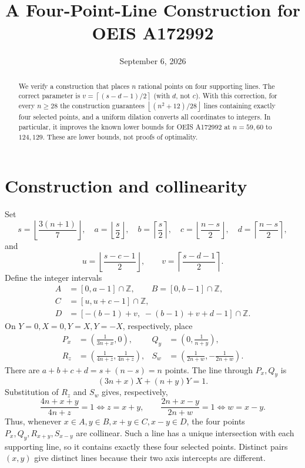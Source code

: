 \documentclass[11pt,a4paper]{article}
\title{A Four-Point-Line Construction for OEIS A172992}
\author{}
\date{September 6, 2026}
\newcommand{\floor}[1]{\left\lfloor #1\right\rfloor}
\newcommand{\ceil}[1]{\left\lceil #1\right\rceil}
\newcommand{\Z}{\mathbb Z}
\begin{document}
\maketitle
\vspace{-2.5em}

\begin{abstract}
We verify a construction that places $n$ rational points on four supporting
lines.  The correct parameter is $v=\ceil{(s-d-1)/2}$ (with $d$, not $c$).
With this correction, for every $n\ge28$ the construction guarantees
$\floor{(n^2+12)/28}$ lines containing exactly four selected points, and a
uniform dilation converts all coordinates to integers.  In particular, it
improves the known lower bounds for OEIS A172992 at $n=59,60$ to $124,129$.
These are lower bounds, not proofs of optimality.
\end{abstract}

\section*{Construction and collinearity}
Set
\[
 s=\floor{\frac{3(n+1)}7},\quad
 a=\floor{\frac s2},\quad b=\ceil{\frac s2},\quad
 c=\floor{\frac{n-s}2},\quad d=\ceil{\frac{n-s}2},
\]
and
\[
 u=\floor{\frac{s-c-1}{2}},\qquad
 v=\ceil{\frac{s-d-1}{2}}.
\]
Define the integer intervals
\[
\begin{split}
 A&=[0,a-1]\cap\Z,\qquad B=[0,b-1]\cap\Z,\\
 C&=[u,u+c-1]\cap\Z,\\
 D&=[-(b-1)+v,\;-(b-1)+v+d-1]\cap\Z.
\end{split}
\]
On $Y=0,X=0,Y=X,Y=-X$, respectively, place
\[
\begin{aligned}
 P_x&=\left(\frac1{3n+x},0\right),&
 Q_y&=\left(0,\frac1{n+y}\right),\\
 R_z&=\left(\frac1{4n+z},\frac1{4n+z}\right),&
 S_w&=\left(\frac1{2n+w},-\frac1{2n+w}\right).
\end{aligned}
\]
There are $a+b+c+d=s+(n-s)=n$ points.  The line through $P_x,Q_y$ is
\[
 (3n+x)X+(n+y)Y=1.
\]
Substitution of $R_z$ and $S_w$ gives, respectively,
\[
 \frac{4n+x+y}{4n+z}=1\iff z=x+y,
 \qquad
 \frac{2n+x-y}{2n+w}=1\iff w=x-y.
\]
Thus, whenever $x\in A,y\in B,x+y\in C,x-y\in D$, the four points
$P_x,Q_y,R_{x+y},S_{x-y}$ are collinear.  Such a line has a unique
intersection with each supporting line, so it contains exactly these four
selected points.  Distinct pairs $(x,y)$ give distinct lines because their
two axis intercepts are different.
\end{document}
